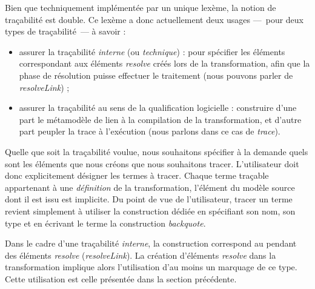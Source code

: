 %    

Bien que techniquement implémentée par un unique lexème, la notion de
traçabilité est double. Ce lexème a donc actuellement deux usages ---~pour deux
types de traçabilité~--- à savoir :
\begin{itemize}

  \item assurer la traçabilité \emph{interne} (ou \emph{technique}) : pour
    spécifier les éléments correspondant aux éléments \emph{resolve} créés lors
    de la transformation, afin que la phase de résolution puisse effectuer le
    traitement (nous pouvons parler de \emph{resolveLink}) ;

  \item assurer la traçabilité au sens de la qualification logicielle :
    construire d'une part le métamodèle de lien à la compilation de la
    transformation, et d'autre part peupler la trace à l'exécution (nous
    parlons dans ce cas de \emph{trace}).

\end{itemize}

Quelle que soit la traçabilité voulue, nous souhaitons spécifier à la demande
quels sont les éléments que nous créons que nous souhaitons tracer.
L'utilisateur doit donc explicitement désigner les termes {\tom} à tracer.
Chaque terme traçable appartenant à une \emph{définition} de la transformation,
l'élément du modèle source dont il est issu est implicite. Du point de vue de
l'utilisateur, tracer un terme revient simplement à utiliser la construction
dédiée en spécifiant son nom, son type et en écrivant le terme {\via} la
construction \emph{backquote}.

Dans le cadre d'une traçabilité \emph{interne}, la construction correspond au
pendant des éléments \emph{resolve} (\emph{resolveLink}). La création
d'éléments \emph{resolve} dans la transformation implique alors l'utilisation
d'au moins un marquage de ce type. Cette utilisation est celle présentée dans
la section précédente.

